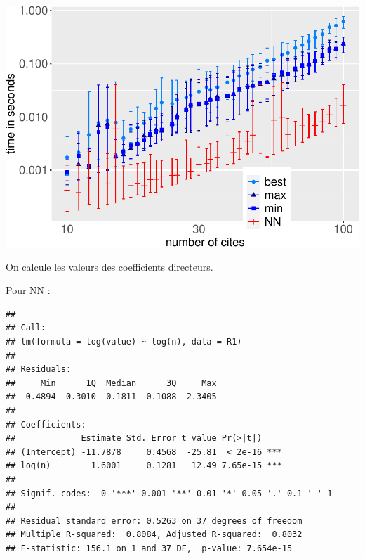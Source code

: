 \documentclass[
]{article}
\newenvironment{Shaded}{\begin{snugshade}}{\end{snugshade}}
\newcommand{\AttributeTok}[1]{\textcolor[rgb]{0.77,0.63,0.00}{#1}}
\newcommand{\DecValTok}[1]{\textcolor[rgb]{0.00,0.00,0.81}{#1}}
\newcommand{\FunctionTok}[1]{\textcolor[rgb]{0.00,0.00,0.00}{#1}}
\newcommand{\NormalTok}[1]{#1}
\newcommand{\OtherTok}[1]{\textcolor[rgb]{0.56,0.35,0.01}{#1}}
\newcommand{\SpecialCharTok}[1]{\textcolor[rgb]{0.00,0.00,0.00}{#1}}
\newcommand{\StringTok}[1]{\textcolor[rgb]{0.31,0.60,0.02}{#1}}
\begin{document}
\includegraphics{rapport_TSP_files/figure-latex/plot simu results-1.pdf}

On calcule les valeurs des coefficients directeurs.

Pour NN :

\begin{Shaded}
\end{Shaded}

\begin{verbatim}
## 
## Call:
## lm(formula = log(value) ~ log(n), data = R1)
## 
## Residuals:
##     Min      1Q  Median      3Q     Max 
## -0.4894 -0.3010 -0.1811  0.1088  2.3405 
## 
## Coefficients:
##             Estimate Std. Error t value Pr(>|t|)    
## (Intercept) -11.7878     0.4568  -25.81  < 2e-16 ***
## log(n)        1.6001     0.1281   12.49 7.65e-15 ***
## ---
## Signif. codes:  0 '***' 0.001 '**' 0.01 '*' 0.05 '.' 0.1 ' ' 1
## 
## Residual standard error: 0.5263 on 37 degrees of freedom
## Multiple R-squared:  0.8084, Adjusted R-squared:  0.8032 
## F-statistic: 156.1 on 1 and 37 DF,  p-value: 7.654e-15
\end{verbatim}
\end{document}
